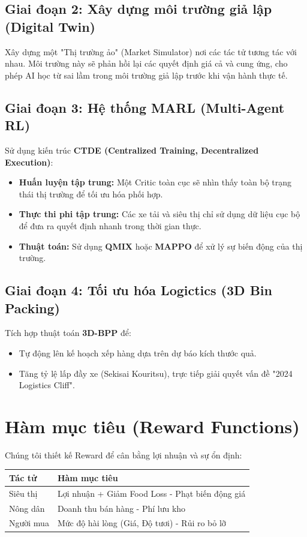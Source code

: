 \documentclass[12pt, a4paper]{article}
\begin{document}
\subsection{Giai đoạn 2: Xây dựng môi trường giả lập (Digital Twin)}
Xây dựng một "Thị trường ảo" (Market Simulator) nơi các tác tử tương tác với nhau. Môi trường này sẽ phản hồi lại các quyết định giá cả và cung ứng, cho phép AI học từ sai lầm trong môi trường giả lập trước khi vận hành thực tế.

\subsection{Giai đoạn 3: Hệ thống MARL (Multi-Agent RL)}
Sử dụng kiến trúc \textbf{CTDE (Centralized Training, Decentralized Execution)}:
\begin{itemize}
    \item \textbf{Huấn luyện tập trung:} Một Critic toàn cục sẽ nhìn thấy toàn bộ trạng thái thị trường để tối ưu hóa phối hợp.
    \item \textbf{Thực thi phi tập trung:} Các xe tải và siêu thị chỉ sử dụng dữ liệu cục bộ để đưa ra quyết định nhanh trong thời gian thực.
    \item \textbf{Thuật toán:} Sử dụng \textbf{QMIX} hoặc \textbf{MAPPO} để xử lý sự biến động của thị trường.
\end{itemize}

\subsection{Giai đoạn 4: Tối ưu hóa Logictics (3D Bin Packing)}
Tích hợp thuật toán \textbf{3D-BPP} để:
\begin{itemize}
    \item Tự động lên kế hoạch xếp hàng dựa trên dự báo kích thước quả.
    \item Tăng tỷ lệ lấp đầy xe (Sekisai Kouritsu), trực tiếp giải quyết vấn đề "2024 Logistics Cliff".
\end{itemize}

\section{Hàm mục tiêu (Reward Functions)}
Chúng tôi thiết kế Reward để cân bằng lợi nhuận và sự ổn định:
\begin{table}[H]
\centering
\begin{tabular}{ll}
\toprule
\textbf{Tác tử} & \textbf{Hàm mục tiêu} \\
\midrule
Siêu thị & Lợi nhuận + Giảm Food Loss - Phạt biến động giá \\
Nông dân & Doanh thu bán hàng - Phí lưu kho \\
Người mua & Mức độ hài lòng (Giá, Độ tươi) - Rủi ro bỏ lỡ \\
\bottomrule
\end{tabular}
\end{table}
\end{document}

